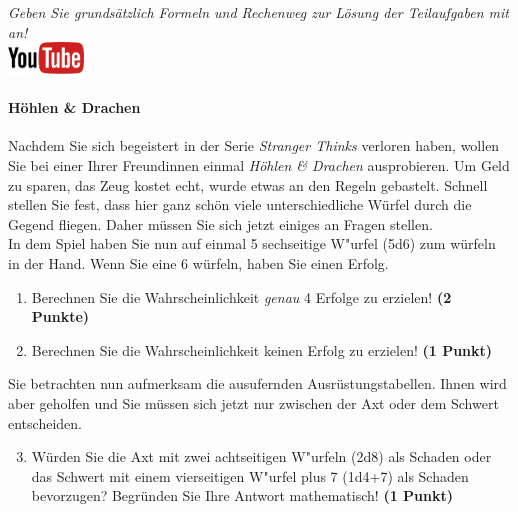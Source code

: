 \documentclass[a4paper, 9pt]{scrartcl}\usepackage[]{graphicx}\usepackage[]{xcolor}
\begin{document}
\textit{Geben Sie grunds{\"a}tzlich Formeln und Rechenweg zur L{\"o}sung der
  Teilaufgaben mit an!} \\[1Ex]

\hfill\href{https://youtu.be/8Pb2sKUIMyk}{\includegraphics[width =
  2cm]{img/youtube}} %
\hspace{2Ex}

\paragraph{H{\"o}hlen \& Drachen}



Nachdem Sie sich begeistert in der Serie \textit{Stranger Thinks} verloren
haben, wollen Sie bei einer Ihrer Freundinnen einmal \textit{H{\"o}hlen \& Drachen}
ausprobieren. Um Geld zu sparen, das Zeug kostet echt, wurde etwas an den
Regeln gebastelt. Schnell stellen Sie fest, dass hier ganz sch{\"o}n viele
unterschiedliche W{\"u}rfel durch die Gegend fliegen. Daher m{\"u}ssen Sie sich
jetzt einiges an Fragen stellen. \\%

In dem Spiel haben Sie nun auf einmal 5 sechseitige W{"u}rfel (5d6) zum w{\"u}rfeln in der Hand. Wenn Sie eine 6 w{\"u}rfeln,
haben Sie einen Erfolg.

\begin{enumerate}
\item Berechnen Sie die Wahrscheinlichkeit \textit{genau}
  4 Erfolge zu erzielen!  \textbf{(2 Punkte)}
\item Berechnen Sie die Wahrscheinlichkeit keinen Erfolg zu erzielen!
  \textbf{(1 Punkt)}
\end{enumerate}

Sie betrachten nun aufmerksam die ausufernden Ausr{\"u}stungstabellen. Ihnen
wird aber geholfen und Sie m{\"u}ssen sich jetzt nur zwischen der Axt oder dem
Schwert entscheiden.

\begin{enumerate}
  \setcounter{enumi}{2}
\item W{\"u}rden Sie die Axt mit zwei achtseitigen W{"u}rfeln (2d8) als Schaden oder
  das Schwert mit einem vierseitigen W{"u}rfel plus 7 (1d4+7) als Schaden bevorzugen?
  Begr{\"u}nden Sie Ihre Antwort mathematisch! \textbf{(1 Punkt)}
\end{enumerate}
\end{document}
